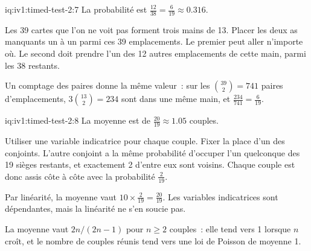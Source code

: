 \begin{solution}{iq:iv1:timed-test-2:7}
La probabilité est $\frac{12}{38} = \frac{6}{19} \approx 0.316$.

Les 39 cartes que l'on ne voit pas forment trois mains de 13. Placer les deux as manquants un à un parmi ces 39 emplacements. Le premier peut aller n'importe où. Le second doit prendre l'un des 12 autres emplacements de cette main, parmi les 38 restants.

Un comptage des paires donne la même valeur~: sur les $\binom{39}{2} = 741$ paires d'emplacements, $3\binom{13}{2} = 234$ sont dans une même main, et $\frac{234}{741} = \frac{6}{19}$.

\end{solution}

\begin{solution}{iq:iv1:timed-test-2:8}
La moyenne est de $\frac{20}{19} \approx 1.05$ couples.

Utiliser une variable indicatrice pour chaque couple. Fixer la place d'un des conjoints. L'autre conjoint a la même probabilité d'occuper l'un quelconque des 19 sièges restants, et exactement 2 d'entre eux sont voisins. Chaque couple est donc assis côte à côte avec la probabilité $\frac{2}{19}$.

Par linéarité, la moyenne vaut $10 \times \frac{2}{19} = \frac{20}{19}$. Les variables indicatrices sont dépendantes, mais la linéarité ne s'en soucie pas.

La moyenne vaut $2n/(2n - 1)$ pour $n \ge 2$ couples~: elle tend vers 1 lorsque $n$ croît, et le nombre de couples réunis tend vers une loi de Poisson de moyenne 1.

\end{solution}

